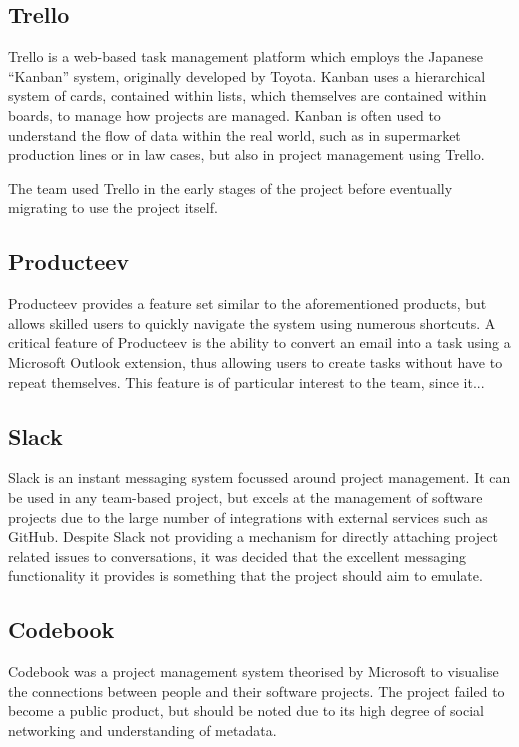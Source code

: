 \documentclass[a4paper]{l3proj}
\begin{document}
\subsection{Trello}
\label{trello}

Trello is a web-based task management platform which employs the Japanese ``Kanban''
system, originally developed by Toyota. Kanban uses a hierarchical system of
cards, contained within lists, which themselves are contained within boards, to
manage how projects are managed. Kanban is often used to understand the flow of data within the real world, such as in supermarket production lines or in law cases, but also in project management using Trello.

The team used Trello in the early stages of the project before eventually migrating to use the project itself.

\subsection{Producteev}
\label{producteev}

Producteev provides a feature set similar to the aforementioned products, but allows skilled users to quickly navigate the system using numerous shortcuts. A critical feature of Producteev is the ability to convert an email into a task using a Microsoft Outlook extension, thus allowing users to create tasks without have to repeat themselves. This feature is of particular interest to the team, since it... 


\subsection{Slack}
\label{slack}
Slack is an instant messaging system focussed around project management. It can be used in any team-based project, but excels at the management of software projects due to the large number of integrations with external services such as GitHub. Despite Slack not providing a mechanism for directly attaching project related issues to conversations, it was decided that the excellent messaging functionality it provides is something that the project should aim to emulate.

\subsection{Codebook}
\label{codebook}
Codebook was a project management system theorised by Microsoft to visualise the connections between people and their software projects. The project failed to become a public product, but should be noted due to its high degree of social networking and understanding of metadata.
\end{document}
